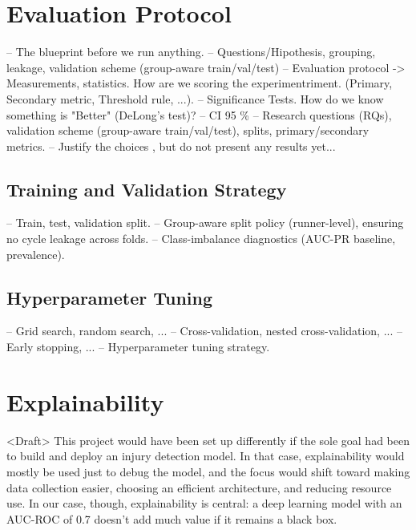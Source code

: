 \section{Evaluation Protocol}\label{sec:method-evaluation-protocol}
-- The blueprint before we run anything.
-- Questions/Hipothesis, grouping, leakage, validation scheme (group-aware train/val/test)
-- Evaluation protocol -> Measurements, statistics. How are we scoring the experimentriment. (Primary, Secondary metric, Threshold rule, ...).
-- Significance Tests. How do we know something is "Better" (DeLong's test)?
-- CI 95 \%
-- Research questions (RQs), validation scheme (group-aware train/val/test), splits, primary/secondary metrics.
-- Justify the choices , but do not present any results yet...


\subsection{Training and Validation Strategy}\label{subsec:method-training-validation-strategy}
-- Train, test, validation split.
-- Group-aware split policy (runner-level), ensuring no cycle leakage across folds.
-- Class-imbalance diagnostics (AUC-PR baseline, prevalence).

\subsection{Hyperparameter Tuning}\label{subsec:method-hyperparameter-tuning}
-- Grid search, random search, ...
-- Cross-validation, nested cross-validation, ...
-- Early stopping, ...
-- Hyperparameter tuning strategy.




\section{Explainability}\label{sec:method-explainability}
<Draft> This project would have been set up differently if the sole goal had been to build and deploy an injury detection model. In that case, explainability would mostly be used just to debug the model, and the focus would shift toward making data collection easier, choosing an efficient architecture, and reducing resource use. In our case, though, explainability is central: a deep learning model with an AUC-ROC of 0.7 doesn't add much value if it remains a black box.

